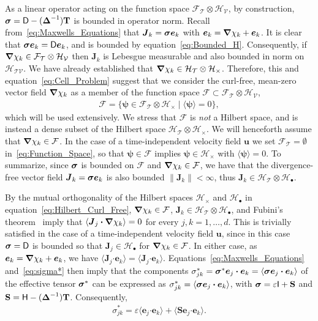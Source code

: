 \documentclass[leqno,onefignum,onetabnum]{siamltex1213}
\newcommand{\Tb}{\mathbf{T}}
\newcommand{\Sb}{\mathbf{S}}
\newcommand{\Tc}{\mathcal{T}}
\newcommand{\Vc}{\mathcal{V}}
\newcommand{\Hc}{\mathcal{H}}
\newcommand{\Fc}{\mathcal{F}}
\newcommand{\Dm}{\mathsf{D}}
\newcommand{\Hm}{\mathsf{H}}
\newcommand{\Ib}{\mathsf{I}}
\newcommand\bsig{\mbox{\boldmath${\sigma}$}}
\newcommand\bDelta{\mbox{\boldmath${\Delta}$}}
\newcommand\bnabla{\mbox{\boldmath${\nabla}$}}
\providecommand\bcdot{\boldsymbol{\cdot}}
\newcommand{\vecJ}{\boldsymbol{J}}
\newcommand{\vecu}{\boldsymbol{u}}
\newcommand{\vece}{\boldsymbol{e}}
\newcommand{\vecpsi}{\boldsymbol{\psi}}
\begin{document}
As a linear operator acting on the function space
$\Fc_{\Tc}\otimes\Hc_{\Vc}$, by construction,
$\bsig=\Dm-(\bDelta^{-1})\Tb$ is bounded in operator norm. Recall
from~\eqref{eq:Maxwells_Equations} that $\vecJ_k=\bsig\vece _k$
with $\vece _k=\bnabla \chi_k+\vece _k$. It is clear that
$\bsig\vece _k=\Dm\vece _k$, and is bounded by
equation~\eqref{eq:Bounded_H}. Consequently, if 
$\bnabla \chi_k\in\Fc_{\Tc}\otimes\Hc_{\Vc}$ then  
$\vecJ_k$ is Lebesgue measurable and also bounded in norm on 
$\Hc_{\Tc\Vc}$. We have already established that 
$\bnabla \chi_k\in\Hc_{\Tc}\otimes\Hc_\times$. Therefore, this and
equation~\eqref{eq:Cell_Problem} suggest that we consider the
curl-free, 
mean-zero vector field $\bnabla \chi_k$ as a member of the function space
$\Fc\subset\Fc_{\Tc}\otimes\Hc_{\Vc}$,         
%
\begin{align}\label{eq:Function_Space}
  \Fc=\{\vecpsi\in\Fc_{\Tc}\otimes\Hc_\times \;|\; \langle\vecpsi\rangle=0\},  
\end{align}
%
which will be used extensively. We
stress that $\Fc$ is \emph{not} a Hilbert space, and is instead a
dense subset of the Hilbert space $\Hc_{\Tc}\otimes\Hc_\times$. We will
henceforth assume that $\bnabla \chi_k\in\Fc$. In the case of a
time-independent velocity field $\vecu $ we set $\Fc_{\Tc}=\emptyset$
in~\eqref{eq:Function_Space}, so that $\vecpsi\in\Fc$ implies  
$\vecpsi\in\Hc_\times$ with $\langle\vecpsi\rangle=0$. To summarize, since $\bsig$ is
bounded on $\Fc$ and $\bnabla \chi_k\in\Fc$, we have that the
divergence-free vector field $\vecJ_k=\bsig\vece _k$ is also
bounded $\|\vecJ_k\|<\infty$, thus $\vecJ_k\in\Hc_{\Tc}\otimes\Hc_\bullet$.  






By the mutual orthogonality of the Hilbert spaces $\Hc_\times$ and $\Hc_\bullet$
in equation~\eqref{eq:Hilbert_Curl_Free}, 
$\bnabla \chi_k\in\Fc$, $\vecJ_k\in\Hc_{\Tc}\otimes\Hc_\bullet$, and Fubini's
theorem~\cite{Folland:99:RealAnalysis} imply that $\langle\vecJ_j\bcdot\bnabla \chi_k\rangle=0$
for every 
$j,k=1,\ldots,d$. This is trivially 
satisfied in the case of a time-independent velocity field $\vecu $,
since in this case $\bsig=\Dm$ is bounded so that
$\vecJ_j\in\Hc_\bullet$ for $\bnabla \chi_k\in\Fc$. In either case, as
$\vece _k=\bnabla \chi_k+\vece _k$, we have
$\langle\vecJ_j\bcdot\vece _k\rangle=\langle\vecJ_j\bcdot\vece
_k\rangle$. Equations~\eqref{eq:Maxwells_Equations} and~\eqref{eq:sigma*}
then imply that 
the components
$\sigma^*_{jk}=\bsig^*\vece _j\bcdot\vece _k=\langle\bsig\vece _j\bcdot\vece _k\rangle$ of 
the effective tensor $\bsig^*$ can be expressed as
$\sigma^*_{jk}=\langle\bsig\vece _j\bcdot\vece _k\rangle$, with $\bsig=\varepsilon\Ib+\Sb$ and
$\Sb=\Hm-(\bDelta^{-1})\Tb$. Consequently,      
%
\begin{align}\label{eq:Reduction}
  \sigma^*_{jk} %
       =\varepsilon\langle\vece _j\bcdot\vece _k\rangle+\langle\Sb\vece _j\bcdot\vece _k\rangle.      
\end{align}
%
\end{document}
